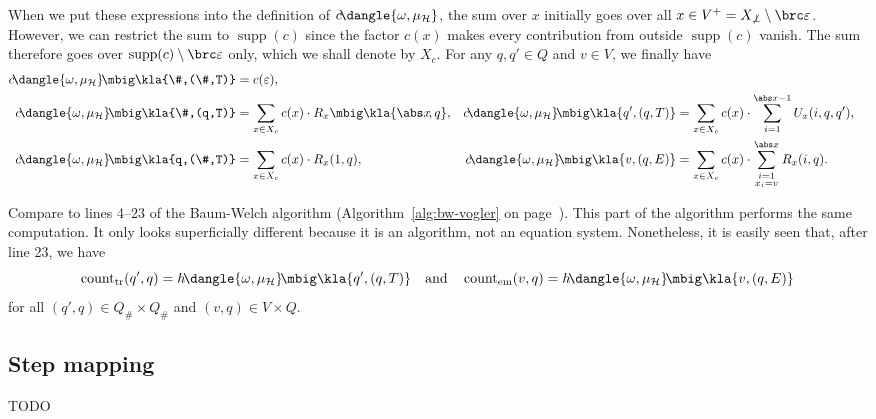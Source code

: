 When we put these expressions into the definition of
$c\!\dangle{\omega,\mu_\uh}$, the sum over $x$ initially goes over all $x\in
V^+ = X_{\not\bot}\setminus\brc\eps$. However, we can restrict the sum to
$\operatorname{supp}(c)$ since the factor $c(x)$ makes every contribution from
outside $\operatorname{supp}(c)$ vanish. The sum therefore goes over
$\operatorname{supp}(c)\setminus\brc\eps$ only, which we shall denote by $X_c$.
For any $q,q'\in Q$ and $v\in V$, we finally have
\begin{align*}
 c\!\dangle{\omega,\mu_\uh}\!\mbig\kla{\#,(\#,T)} &= c(\eps), \\
 c\!\dangle{\omega,\mu_\uh}\!\mbig\kla{\#,(q,T)} &= \sum_{x\in X_c} c(x) \cdot R_x\mbig\kla{\abs x\!,q}, &
 c\!\dangle{\omega,\mu_\uh}\!\mbig\kla{q',(q,T)} &= \sum_{x\in X_c} c(x) \cdot \sum_{i=1}^{\abs x-1} U_x(i,q,q'), \\
 c\!\dangle{\omega,\mu_\uh}\!\mbig\kla{q,(\#,T)} &= \sum_{x\in X_c} c(x) \cdot R_x(1,q), &
 c\!\dangle{\omega,\mu_\uh}\!\mbig\kla{v,(q,E)} &= \sum_{x\in X_c} c(x) \cdot \sum_{{\scriptstyle i=1}\atop{\scriptstyle x_i=v}}^{\abs x} R_x(i,q).
\end{align*}

Compare to lines 4--23 of the Baum-Welch algorithm
(Algorithm~\ref{alg:bw-vogler} on page~\pageref{alg:bw-vogler}). This part of
the algorithm performs the same computation. It only looks superficially
different because it is an algorithm, not an equation system. Nonetheless,
it is easily seen that, after line 23, we have
\[
 \cnt_\mathrm{tr}(q',q) = h\!\dangle{\omega,\mu_\uh}\!\mbig\kla{q',(q,T)}
 \quad\text{and}\quad
 \cnt_\mathrm{em}(v,q) = h\!\dangle{\omega,\mu_\uh}\!\mbig\kla{v,(q,E)}
\]
for all $(q',q)\in Q_\#\times Q_\#$ and $(v,q)\in V\times Q$.

\subsection{Step mapping}

{\color{red}TODO}
